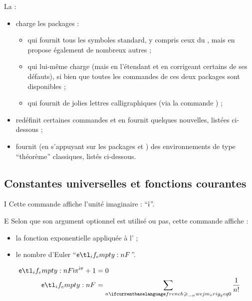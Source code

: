 \documentclass[french,nolocaltoc]{nwejmart}
\newtheorem[style=definition]{fait}
\newtheorem[title=expérience]{experience}
\newtheorem[title-plural=anneaux]{anneau}
\newtheorem[title=idéal,title-plural=idéaux]{ideal}
\begin{document}
La \nwejmauthorcl{} :
\begin{itemize}
\item charge les packages :
  \begin{itemize}
  \item {} qui fournit tous les symboles standard, y compris
    ceux du , mais en propose également de nombreux autres ;
  \item {} qui lui-même charge  (mais en
    l'étendant et en corrigeant certains de ses défauts), si bien que toutes les
    commandes de ces deux packages sont disponibles ;
  \item {} qui fournit de jolies lettres calligraphiques (via
    la commande ) ;
  \end{itemize}
\item redéfinit certaines commandes et en fournit quelques nouvelles, listées
  ci-dessous ;
\item fournit (en s'appuyant sur les packages  et
  ) des environnements de type \enquote{théorème} classiques,
  listés ci-dessous.
\end{itemize}

\subsection{Constantes universelles et fonctions courantes}

\begin{docCommand}{I}{}
  Cette commande affiche l'unité imaginaire : \enquote{$\mathsf{i}$}.
\end{docCommand}

\begin{docCommand}{E}{}
 Selon que son argument optionnel est utilisé ou pas, cette commande affiche :
  \begin{itemize}
  \item la fonction exponentielle appliquée à l' ;
  \item le nombre d'Euler \enquote{$\E$}.
  \end{itemize}
\end{docCommand}

\begin{bodycode}
\begin{align}
  \E[\I\pi]+1 & = 0 \\
  \E          & = \sum_{n\geq 0} \frac{1}{n!}
\end{align}
\end{bodycode}
\end{document}
